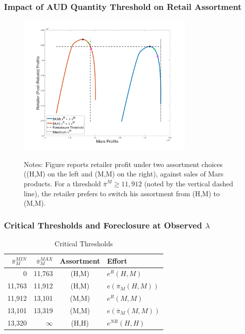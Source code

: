 \begin{frame}
\frametitle{Impact of AUD Quantity Threshold on Retail Assortment}

 \begin{figure}[h!]
\begin{center}
\vspace{-0.1in}
\includegraphics[width=3.4in]{newfigure4.png}
\label{fig:threshold}
\end{center}
\tiny
Notes: Figure reports retailer profit under two assortment choices ((H,M) on the left and (M,M) on the right), against sales of Mars products.  For a threshold $\overline{\pi}^M \geq 11,912$ (noted by the vertical dashed line), the retailer prefers to switch his assortment from (H,M) to (M,M).
\end{figure}
\end{frame}

\begin{frame}
\frametitle{Critical Thresholds and Foreclosure at Observed $\lambda$}
\begin{table}[htp]
\caption{Critical Thresholds}
\begin{center}
\begin{tabular}{|r r c l|}
\hline
$\overline{\pi}_M^{MIN}$ & $\overline{\pi}_M^{MAX}$ & Assortment & Effort \\ \hline \hline
0 & 11,763 & (H,M) & $e^R(H,M)$ \\
11,763 & 11,912 & (H,M) & $e(\overline{\pi}_M(H,M))$ \\
11,912 & 13,101 & (M,M) & $e^R(M,M)$ \\
13,101 & 13,319 & (M,M) & $e(\overline{\pi}_M(M,M))$ \\
13,320 & $\infty$ & (H,H) & $e^{NR}(H,H)$ \\ \hline
\end{tabular}
\end{center}
\label{tab:thresholdsnew}
\end{table}

\end{frame}




